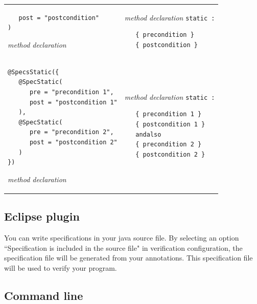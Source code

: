 \documentclass{article}
\begin{document}
\begin{longtable}{ m{7cm} | m{5cm} }
\begin{verbatim}
   post = "postcondition"
)
\end{verbatim}
\it{method declaration}
&
{\it method declaration} \texttt{static :}
\begin{verbatim}
   { precondition }
   { postcondition }
\end{verbatim}
\\
\begin{verbatim}
@SpecsStatic({
   @SpecStatic(
      pre = "precondition 1", 
      post = "postcondition 1"
   ),
   @SpecStatic(
      pre = "precondition 2", 
      post = "postcondition 2"
   )
})
\end{verbatim}
\it{method declaration}
&
{\it method declaration} \texttt{static :}
\begin{verbatim}
   { precondition 1 }
   { postcondition 1 }
   andalso
   { precondition 2 }
   { postcondition 2 }
\end{verbatim}
\end{longtable}

\subsection*{Eclipse plugin}

You can write specifications in your java source file. By selecting an option ``Specification is included in the source file" in verification configuration, the specification file will be generated from your annotations. This specification file will be used to verify your program.

\subsection*{Command line}
\end{document}
